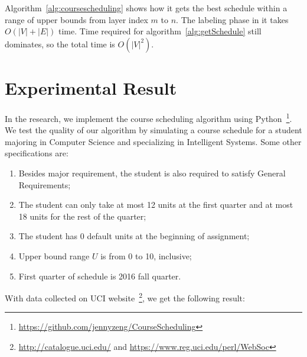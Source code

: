 \documentclass[letterpaper,12pt]{article}
\theoremstyle{definition}
\begin{document}
Algorithm~\ref{alg:coursescheduling} shows how it gets the best schedule within a range of upper bounds from layer index $m$ to $n$. The labeling phase in it takes $O(|V|+|E|)$ time. Time required for algorithm~\ref{alg:getSchedule} still dominates, so the total time is $O(|V|^2)$.

\section{Experimental Result}

In the research, we implement the course scheduling algorithm using Python~\footnote{\url{https://github.com/jennyzeng/CourseScheduling}}. We test the quality of our algorithm by simulating a course schedule for a student majoring in Computer Science and specializing in Intelligent Systems. Some other specifications are:
\begin{enumerate}
    \item Besides major requirement, the student is also required to satisfy General Requirements;
    \item The student can only take at most 12 units at the first quarter and at most 18 units for the rest of the quarter;
    \item The student has 0 default units at the beginning of assignment;
    \item Upper bound range $U$ is from 0 to 10, inclusive;
    \item First quarter of schedule is 2016 fall quarter. 
\end{enumerate}
With data collected on UCI website~\footnote{\url{http://catalogue.uci.edu/} and \url{https://www.reg.uci.edu/perl/WebSoc}}, we get the following result:
\end{document}
